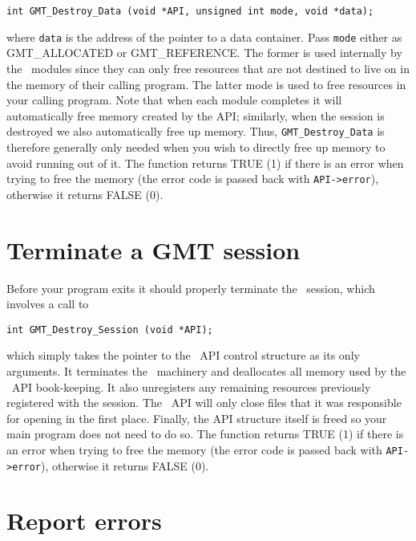 \documentclass[11pt]{report}
\begin{document}
\begin{verbatim}
int GMT_Destroy_Data (void *API, unsigned int mode, void *data);
\end{verbatim}
where \texttt{data} is the address of the pointer to a data container.
Pass \texttt{mode} either as GMT\_ALLOCATED or GMT\_REFERENCE.  The former
is used internally by the \GMT\ modules since they can only free resources that are
not destined to live on in the memory of their calling program.  The latter mode is used
to free resources in your calling program.  Note that when each module completes it will
automatically free memory created by the API; similarly, when the session is destroyed
we also automatically free up memory.  Thus, \texttt{GMT\_Destroy\_Data} is therefore
generally only needed when you wish to directly free up memory to avoid running out of it.
The function returns TRUE (1) if there is an error when trying to free the memory
(the error code is passed back with \texttt{API->error}), otherwise it returns FALSE (0).

\section{Terminate a GMT session}

Before your program exits it should properly terminate the \GMT\ session, which involves a call to

\begin{verbatim}
int GMT_Destroy_Session (void *API);
\end{verbatim}
which simply takes the pointer to the \GMT\ API control structure as its only arguments.  It 
terminates the \GMT\ machinery and deallocates all memory used by the \GMT\ API book-keeping.
It also unregisters any remaining resources previously registered with the session.
The \GMT\ API will only close files that it was responsible for opening in the first place.
Finally, the API structure itself is freed so your main program does not need to do so.
The function returns TRUE (1) if there is an error when trying to free the memory
(the error code is passed back with \texttt{API->error}), otherwise it returns FALSE (0).

\section{Report errors}
\end{document}
